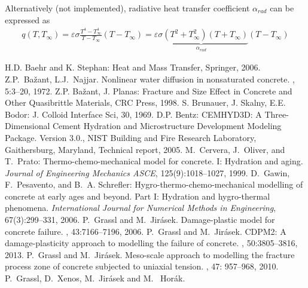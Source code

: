 \documentclass[a4paper]{article}
\begin{document}
Alternatively (not implemented), radiative heat transfer coefficient $\alpha_{rad}$ can be expressed as \cite[pp.28]{Baehr:06}
\begin{eqnarray}
q(T, T_\infty) = \varepsilon \sigma \frac{T^4 - T_\infty^4}{T-T_\infty}(T-T_\infty) = \underbrace{\varepsilon \sigma (T^2+T_\infty^2)(T+T_\infty)}_{\alpha_{rad}}(T-T_\infty)
\end{eqnarray}

\begin{thebibliography}{99}
 H.D. Baehr and K. Stephan: Heat and Mass Transfer, Springer, 2006.
 Z.P.~Ba\v{z}ant, L.J.~Najjar.
\newblock  Nonlinear water diffusion in nonsaturated concrete.
, 5:3--20, 1972.
 Z.P. Ba\v{z}ant, J. Planas: Fracture and Size
  Effect in Concrete and Other Quasibrittle  Materials, CRC Press,
  1998.
 S. Brunauer, J. Skalny, E.E. Bodor: J. Colloid Interface
  Sci, 30, 1969.
 D.P. Bentz: CEMHYD3D: A Three-Dimensional Cement Hydration and Microstructure Development Modeling Package. Version 3.0., NIST Building and Fire Research Laboratory, Gaithersburg, Maryland, Technical report, 2005.
 M.~Cervera, J.~Oliver, and T.~Prato: Thermo-chemo-mechanical model for concrete. I: Hydration and aging. {\em Journal of Engineering Mechanics ASCE}, 125(9):1018--1027, 1999.
 D.~Gawin, F.~Pesavento, and B.~A. Schrefler: Hygro-thermo-chemo-mechanical modelling of concrete at early ages and beyond. Part I: Hydration and hygro-thermal phenomena. {\em International Journal for Numerical Methods in Engineering}, 67(3):299--331, 2006.
 P.~Grassl and M.~Jir\'{a}sek.
\newblock Damage-plastic model for concrete failure.
, 43:7166--7196, 2006.
 P.~Grassl and M.~Jir\'{a}sek.
\newblock CDPM2: A damage-plasticity approach to modelling the failure of concrete.
, 50:3805--3816, 2013.
 P.~Grassl and M.~Jir\'{a}sek.
\newblock Meso-scale approach to modelling the fracture process zone of concrete subjected to uniaxial tension.
, 47: 957--968, 2010.
 P.~Grassl, D.~Xenos, M.~Jir\'{a}sek and M.~ Hor\'{a}k.

\end{thebibliography}
\end{document}

